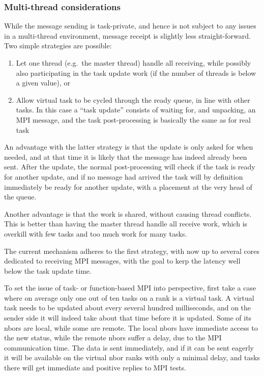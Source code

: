 \documentclass[paper=a4,fontsize=11pt]{scrartcl}
\numberwithin{equation}{section}		%
\numberwithin{figure}{section}			%
\numberwithin{table}{section}				%
\begin{document}
\subsubsection{Multi-thread considerations}
While the message sending is task-private, and hence is not subject to any issues in a multi-thread environment, message receipt is slightly less straight-forward.  Two simple strategies are possible:
\begin{enumerate}
    \item Let one thread (e.g.\ the master thread) handle all receiving, while possibly also participating in the task update work (if the number of threads is below a given value), or
    \item Allow virtual task to be cycled through the ready queue, in line with other tasks.  In this case a ``task update'' consists of waiting for, and unpacking, an MPI message, and the task post-processing is basically the same as for real task
\end{enumerate}
An advantage with the latter strategy is that the update is only asked for when needed, and at that time it is likely that the message has indeed already been sent.  After the update, the normal post-processing will check if the task is ready for another update, and if no message had arrived the task will by definition immediately be ready for another update, with a placement at the very head of the queue.

Another advantage is that the work is shared, without causing thread conflicts. This is better than having the master thread handle all receive work, which is overkill with few tasks and too much work for many tasks.

The current mechanism adheres to the first strategy, with now up to several cores dedicated to receiving MPI messages, with the goal to kerp the latency well below the task update time.

To set the issue of task- or function-based MPI into perspective, first take a case where on average only one out of ten tasks on a rank is a virtual task.  A virtual task needs to be updated about every several hundred milliseconds, and on the sender side it will indeed take about that time before it is updated.  Some of its nbors are local, while some are remote.  The local nbors have immediate access to the new status, while the remote nbors suffer a delay, due to the MPI communication time.  The data is sent immediately, and if it can be sent eagerly it will be available on the virtual nbor ranks with only a minimal delay, and tasks there will get immediate and positive replies to MPI tests.
\end{document}
